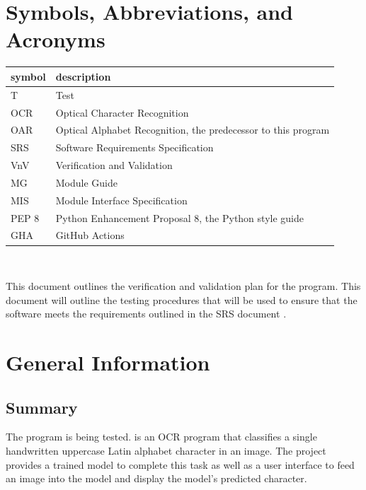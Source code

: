 \documentclass[12pt, titlepage]{article}
\begin{document}
\newpage

\section{Symbols, Abbreviations, and Acronyms}

\renewcommand{\arraystretch}{1.2}
\begin{tabular}{l l} 
  \toprule		
  \textbf{symbol} & \textbf{description}\\
  \midrule 
  T & Test\\
  OCR & Optical Character Recognition\\
  OAR & Optical Alphabet Recognition, the predecessor to this program\\
  SRS & Software Requirements Specification\\
  VnV & Verification and Validation\\
  MG & Module Guide\\
  MIS & Module Interface Specification\\
  PEP 8 & Python Enhancement Proposal 8, the Python style guide\\
  GHA & GitHub Actions\\
  \bottomrule
\end{tabular}\\



\newpage


This document outlines the verification and validation plan for the \progname{}
program. This document will outline the testing procedures that will be used to
ensure that the software meets the requirements outlined in the SRS document \citep{SRS}.

\section{General Information}

\subsection{Summary}

The \progname{} program is being tested. \progname{} is an OCR program that classifies
a single handwritten uppercase Latin alphabet character in an image. The project
provides a trained model to complete this task as well as a user interface to
feed an image into the model and display the model's predicted character.
\end{document}
